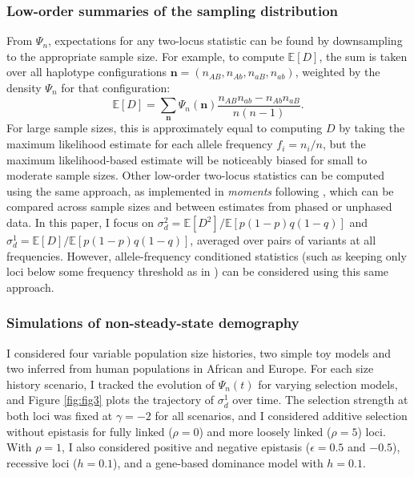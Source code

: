 \documentclass[]{article}
\newcommand{\E}{\mathbb{E}}
\begin{document}
\subsubsection{Low-order summaries of the sampling distribution}
\label{low-order-summaries-of-the-sampling-distribution}

From \(\Psi_n\), expectations for any two-locus statistic can be found by
downsampling to the appropriate sample size. For example, to compute \(\E[D]\),
the sum is taken over all haplotype configurations \(\mathbf{n} = (n_{AB}, n_{Ab}, n_{aB}, n_{ab})\), weighted by the density \(\Psi_n\) for that
configuration:
\begin{equation}
\E[D] = \sum_{\mathbf{n}} \Psi_n(\mathbf{n})
\frac{n_{AB}n_{ab} - n_{Ab}n_{aB}}{n(n-1)}.
\end{equation}
For large sample sizes, this is approximately equal to computing \(D\) by taking
the maximum likelihood estimate for each allele frequency \(f_i = n_i / n\), but
the maximum likelihood-based estimate will be noticeably biased for small to
moderate sample sizes. Other low-order two-locus statistics can be computed
using the same approach, as implemented in \emph{moments} following
\citet{Ragsdale2020-nz}, which can be compared across sample sizes and between
estimates from phased or unphased data. In this paper, I focus on \(\sigma_d^2 = \E[D^2] / \E[p(1-p)q(1-q)]\) and \(\sigma_d^1 = \E[D] / \E[p(1-p)q(1-q)]\),
averaged over pairs of variants at all frequencies. However, allele-frequency
conditioned statistics (such as keeping only loci below some frequency
threshold as in \citet{Good2020-wj}) can be considered using this same approach.

\subsubsection{Simulations of non-steady-state demography}
\label{simulations-of-non-steady-state-demography}

I considered four variable population size histories, two simple toy models and
two inferred from human populations in African and Europe. For each size
history scenario, I tracked the evolution of \(\Psi_n(t)\) for varying selection
models, and Figure \ref{fig:fig3} plots the trajectory of \(\sigma_d^1\) over
time. The selection strength at both loci was fixed at \(\gamma=-2\) for all
scenarios, and I considered additive selection without epistasis for fully
linked (\(\rho=0\)) and more loosely linked (\(\rho=5\)) loci. With \(\rho=1\), I
also considered positive and negative epistasis (\(\epsilon=0.5\) and \(-0.5\)),
recessive loci (\(h=0.1\)), and a gene-based dominance model with \(h=0.1\).
\end{document}
